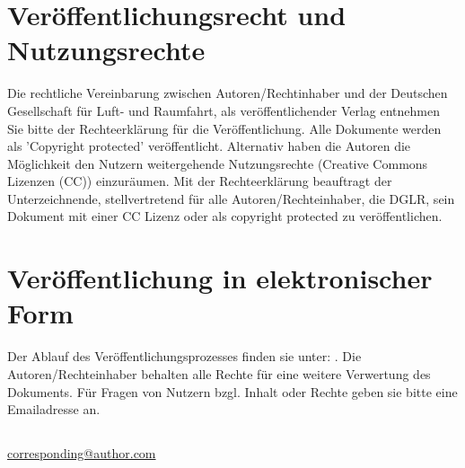 \documentclass[german,10pt]{DLRK_v1.11}
\makeatletter
\newcommand{\ContaktEmailAddress}{corresponding@author.com}
\makeatother
\begin{document}
\section{Ver\"offentlichungsrecht und Nut\-zungs\-rechte}

Die rechtliche Vereinbarung zwischen Autoren/Recht\-inhaber und der Deutschen Gesellschaft für Luft- und Raumfahrt, als veröffentlichender Verlag entnehmen Sie bitte der Rechteerklärung für die Veröffentlichung. Alle Dokumente werden als 'Copyright protected'
veröffentlicht. Alternativ haben die Autoren die Möglichkeit den Nutzern weitergehende
Nutzungsrechte (Creative Commons Lizenzen (CC)) einzuräumen. Mit der Rechteerklärung beauftragt der Unterzeichnende, stellvertretend für alle Autoren/Rechteinhaber, die DGLR, sein Dokument mit einer CC Lizenz oder als copyright protected zu veröffentlichen.

\section{Ver\"offentlichung in elektronischer Form}
Der Ablauf des Veröffentlichungsprozesses finden sie unter: \href{http://www.dglr.de/?id=3484}{\color{blue}{http://www.dglr.de/?id=3484}}. Die Autoren/Rechteinhaber behalten alle Rechte für eine weitere Verwertung des Dokuments. Für Fragen von Nutzern bzgl. Inhalt oder Rechte geben sie bitte eine Emailadresse an.


\subsection*{\ContactSection}
\href{mailto:\ContaktEmailAddress}{\color{blue}\ContaktEmailAddress}




\end{document}
